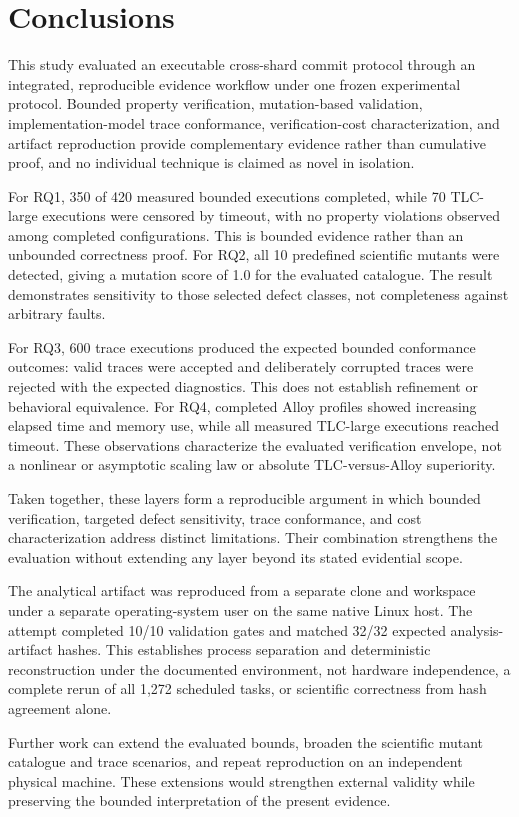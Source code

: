 \section{Conclusions}
\label{sec:conclusions}

This study evaluated an executable cross-shard commit protocol through an
integrated, reproducible evidence workflow under one frozen experimental
protocol. Bounded property verification, mutation-based validation,
implementation-model trace conformance, verification-cost characterization,
and artifact reproduction provide complementary evidence rather than
cumulative proof, and no individual technique is claimed as novel in
isolation.

For RQ1, 350 of 420 measured bounded executions completed, while 70 TLC-large
executions were censored by timeout, with no property violations observed
among completed configurations. This is bounded evidence rather than an
unbounded correctness proof. For RQ2, all 10 predefined scientific mutants
were detected, giving a mutation score of 1.0 for the evaluated catalogue.
The result demonstrates sensitivity to those selected defect classes, not
completeness against arbitrary faults.

For RQ3, 600 trace executions produced the expected bounded conformance
outcomes: valid traces were accepted and deliberately corrupted traces were
rejected with the expected diagnostics. This does not establish refinement or
behavioral equivalence. For RQ4, completed Alloy profiles showed increasing
elapsed time and memory use, while all measured TLC-large executions reached
timeout. These observations characterize the evaluated verification envelope,
not a nonlinear or asymptotic scaling law or absolute TLC-versus-Alloy
superiority.

Taken together, these layers form a reproducible argument in which bounded
verification, targeted defect sensitivity, trace conformance, and cost
characterization address distinct limitations. Their combination strengthens
the evaluation without extending any layer beyond its stated evidential scope.

The analytical artifact was reproduced from a separate clone and workspace
under a separate operating-system user on the same native Linux host. The
attempt completed 10/10 validation gates and matched 32/32 expected
analysis-artifact hashes. This establishes process separation and deterministic
reconstruction under the documented environment, not hardware independence, a
complete rerun of all 1,272 scheduled tasks, or scientific correctness from
hash agreement alone.

Further work can extend the evaluated bounds, broaden the scientific mutant
catalogue and trace scenarios, and repeat reproduction on an independent
physical machine. These extensions would strengthen external validity while
preserving the bounded interpretation of the present evidence.
